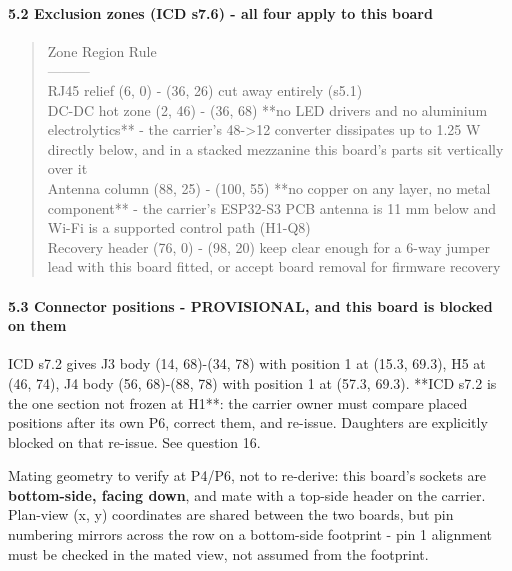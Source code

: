 \documentclass[11pt,a4paper]{article}
\begin{document}
\paragraph*{5.2 Exclusion zones (ICD s7.6) - all four apply to this board}
\begin{quote}\small\ttfamily\raggedright
\textbar{} Zone \textbar{} Region \textbar{} Rule \textbar{}\\
\textbar{}---\textbar{}---\textbar{}---\textbar{}\\
\textbar{} RJ45 relief \textbar{} (6, 0) - (36, 26) \textbar{} cut away entirely (s5.1) \textbar{}\\
\textbar{} DC-DC hot zone \textbar{} (2, 46) - (36, 68) \textbar{} {*}{*}no LED drivers and no aluminium electrolytics{*}{*} - the carrier's 48-\textgreater{}12 converter dissipates up to 1.25 W directly below, and in a stacked mezzanine this board's parts sit vertically over it \textbar{}\\
\textbar{} Antenna column \textbar{} (88, 25) - (100, 55) \textbar{} {*}{*}no copper on any layer, no metal component{*}{*} - the carrier's ESP32-S3 PCB antenna is 11 mm below and Wi-Fi is a supported control path (H1-Q8) \textbar{}\\
\textbar{} Recovery header \textbar{} (76, 0) - (98, 20) \textbar{} keep clear enough for a 6-way jumper lead with this board fitted, or accept board removal for firmware recovery \textbar{}
\end{quote}
\paragraph*{5.3 Connector positions - PROVISIONAL, and this board is blocked on them}
ICD s7.2 gives J3 body (14, 68)-(34, 78) with position 1 at (15.3, 69.3), H5 at (46, 74), J4 body (56, 68)-(88, 78) with position 1 at (57.3, 69.3). {*}{*}ICD s7.2 is the one section not frozen at H1{*}{*}: the carrier owner must compare placed positions after its own P6, correct them, and re-issue. Daughters are explicitly blocked on that re-issue. See question 16.

Mating geometry to verify at P4/P6, not to re-derive: this board's sockets are \textbf{bottom-side, facing down}, and mate with a top-side header on the carrier. Plan-view (x, y) coordinates are shared between the two boards, but pin numbering mirrors across the row on a bottom-side footprint - pin 1 alignment must be checked in the mated view, not assumed from the footprint.
\end{document}
